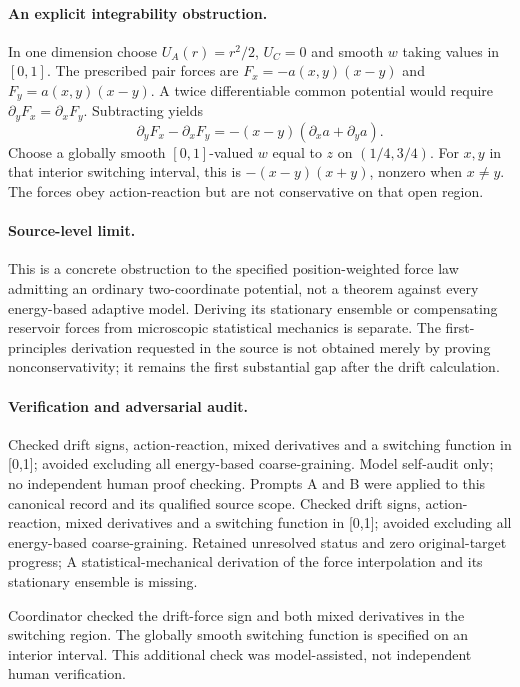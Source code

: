 \documentclass[11pt]{article}
\begin{document}
\paragraph{An explicit integrability obstruction.} In one dimension choose $U_A(r)=r^2/2$, $U_C=0$ and smooth $w$ taking values in $[0,1]$. The prescribed pair forces are $F_x=-a(x,y)(x-y)$ and $F_y=a(x,y)(x-y)$. A twice differentiable common potential would require $\partial_yF_x=\partial_xF_y$. Subtracting yields
\[
 \partial_yF_x-\partial_xF_y=-(x-y)(\partial_xa+\partial_ya).
\]
Choose a globally smooth $[0,1]$-valued $w$ equal to $z$ on $(1/4,3/4)$. For $x,y$ in that interior switching interval, this is $-(x-y)(x+y)$, nonzero when $x\ne y$. The forces obey action-reaction but are not conservative on that open region.

\paragraph{Source-level limit.} This is a concrete obstruction to the specified position-weighted force law admitting an ordinary two-coordinate potential, not a theorem against every energy-based adaptive model. Deriving its stationary ensemble or compensating reservoir forces from microscopic statistical mechanics is separate. The first-principles derivation requested in the source is not obtained merely by proving nonconservativity; it remains the first substantial gap after the drift calculation.

\paragraph{Verification and adversarial audit.}
Checked drift signs, action-reaction, mixed derivatives and a switching function in [0,1]; avoided excluding all energy-based coarse-graining. Model self-audit only; no independent human proof checking. Prompts A and B were applied to this canonical record and its qualified source scope. Checked drift signs, action-reaction, mixed derivatives and a switching function in [0,1]; avoided excluding all energy-based coarse-graining. Retained unresolved status and zero original-target progress; A statistical-mechanical derivation of the force interpolation and its stationary ensemble is missing.

Coordinator checked the drift-force sign and both mixed derivatives in the switching region. The globally smooth switching function is specified on an interior interval. This additional check was model-assisted, not independent human verification.
\end{document}
